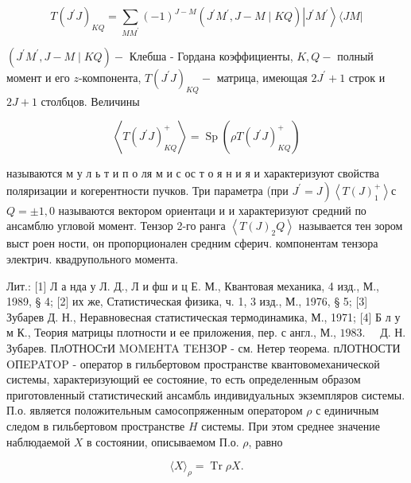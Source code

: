 \documentclass[10pt]{article}
\begin{document}
\[

T\left(J^{\prime} J\right)_{K Q}=\sum_{M M^{\prime}}(-1)^{J-M}\left(J^{\prime} M^{\prime}, J-M \mid K Q\right)\left|J^{\prime} M^{\prime}\right\rangle\langle J M|

\]



$\left(J^{\prime} M^{\prime}, J-M \mid K Q\right)-$ Клебша - Гордана коэффициенты, $K, Q-$ полный момент и его $z$-компонента, $T\left(J^{\prime} J\right)_{K Q}-$ матрица, имеющая $2 J^{\prime}+1$ строк и $2 J+1$ столбцов. Величины



\[

\left\langle T\left(J^{\prime} J\right)_{K Q}^{+}\right\rangle=\operatorname{Sp}\left(\rho T\left(J^{\prime} J\right)_{K Q}^{+}\right)

\]



называются м у л ь т и п о ля м и с ос т о я н и я и характеризуют свойства поляризации и когерентности пучков. Три параметра (при $\left.J^{\prime}=J\right)\left\langle T(J)_{1}^{+}\right\rangle$с $Q= \pm 1,0$ называются вектором ориентаци и и характеризуют средний по ансамблю угловой момент. Тензор 2-го ранга $\left\langle T(J)_{2} Q\right\rangle$ называется тен зором выст роен ности, он пропорционален средним сферич. компонентам тензора электрич. квадрупольного момента.



Лит.: [1] Л а нда у Л. Д., Л и фш и ц Е. М., Квантовая механика, 4 изд., М., 1989, § 4; [2] их же, Статистическая физика, ч. 1, 3 изд., М., 1976, § 5; [3] Зубарев Д. Н., Неравновесная статистическая термодинамика, М., 1971; [4] Б л у м К., Теория матрицы плотности и ее приложения, пер. с англ., М., $1983 . \quad$ Д. Н. Зубарев. ПлОТНОСтИ MOMEHTA TEHЗОР - см. Нетер теорема. пЛОТНОСТИ OПEPATOP - оператор в гильбертовом пространстве квантовомеханической системы, характеризующий ее состояние, то есть определенным образом приготовленный статистический ансамбль индивидуальных экземпляров системы. П.о. является положительным самосопряженным оператором $\rho$ с единичным следом в гильбертовом пространстве $H$ системы. При этом среднее значение наблюдаемой $X$ в состоянии, описываемом П.о. $\rho$, равно



\[

\langle X\rangle_{\rho}=\operatorname{Tr} \rho X .

\]
\end{document}
